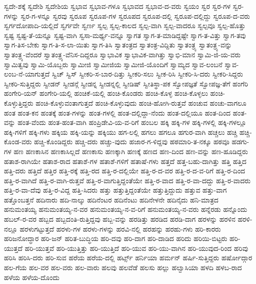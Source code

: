 {ಸ್ವದೇ-ಶಕ್ಕೆ
ಸ್ವದೇಶಿ
ಸ್ವದೇಶಿಯ
ಸ್ವಭಾವ
ಸ್ವಭಾವ-ಗಳೂ
ಸ್ವಭಾವದ
ಸ್ವಭಾವ-ದ-ವರು
ಸ್ವಯಂ
ಸ್ವರ
ಸ್ವರ-ಗಳ
ಸ್ವರ-ಗಳನ್ನು
ಸ್ವರ-ಗ-ಳನ್ನೂ
ಸ್ವರವು
ಸ್ವರೂಪ
ಸ್ವರೂಪ-ಗಳ
ಸ್ವರೂಪದ
ಸ್ವರೂಪ-ದಲ್ಲಿ
ಸ್ವರೂಪ-ದಲ್ಲಿದ್ದು
ಸ್ವರೂಪ-ದ-ವರು
ಸ್ವರ್ಗದೋಪಾದಿ-ಯಲ್ಲಿದೆ
ಸ್ವರ್ಗವೇ
ಸ್ವರ್ಣ
ಸ್ವಲ್ಪ
ಸ್ವಲ್ಪ-ಕಾಲದ
ಸ್ವಲ್ಪ-ವಾಗಿ
ಸ್ವಲ್ಪ-ವಾದರೂ
ಸ್ವಲ್ಪವೂ
ಸ್ವಲ್ಪ-ಹೊತ್ತು
ಸ್ವಷ್ಟ
ಸ್ವಷ್ಟ-ತೆ-ಯನ್ನೂ
ಸ್ವಷ್ಟ-ವಾಗಿ
ಸ್ವಸಾ-ಮರ್ಥ್ಯ-ವನ್ನೂ
ಸ್ವಾಗತ
ಸ್ವಾಗ-ತ-ಮಾಡಿದ್ದಷ್ಟೇ
ಸ್ವಾಗ-ತ-ವಿತ್ತು
ಸ್ವಾಗ-ತವು
ಸ್ವಾಗ-ತಿಸ-ಬೇಕು
ಸ್ವಾಗ-ತಿ-ಸ-ಲಾ-ಯಿತು
ಸ್ವಾಗ-ತಿಸಿ
ಸ್ವಾತಂತ್ರದ
ಸ್ವಾತಂತ್ರ-ವಿದ್ದಿತು
ಸ್ವಾತಂತ್ರ್ಯ
ಸ್ವಾತಂತ್ರ್ಯ-ವನ್ನು
ಸ್ವಾತಂತ್ರ್ಯ-ವೆಂದರೆ
ಸ್ವಾತಂತ್ರ್ಯ-ವೆನಿಸ-ದಿದ್ದರೂ
ಸ್ವಾಭಾವಿಕ
ಸ್ವಾಭಾವಿಕ-ವಾಗಿತ್ತು
ಸ್ವಾಭಿ-ಮಾನ
ಸ್ವಾಮಿ-ಜಿ-ಯ-ವರು
ಸ್ವಾಮಿತ್ವವು
ಸ್ವಾಮಿ-ಯೊಬ್ಬರು
ಸ್ವಾಮೀಜಿ
ಸ್ವಾಮೀಜಿಯ
ಸ್ವಾಮೀಜಿ-ಯೊಂದಿಗೆ
ಸ್ವಾಮ್ಯದ
ಸ್ವಾವ-ಲಂಬನೆ
ಸ್ವಾವ-ಲಂಬ-ನೆ-ಯಾಗುತ್ತದೆ
ಸ್ವಿಚ್
ಸ್ವಿಸ್
ಸ್ವೀಕರಿ-ಸ-ಬಾರ-ದಿತ್ತು
ಸ್ವೀಕರಿ-ಸಲು
ಸ್ವೀಕ-ರಿಸಿ
ಸ್ವೀಕರಿ-ಸಿ-ದರು
ಸ್ವೀಕರಿ-ಸಿದ್ದರು
ಸ್ವೀಕರಿ-ಸುತ್ತಿದ್ದರು
ಸ್ವೀಡನ್
ಸ್ವೀಡನ್ಗೆ
ಸ್ವೀಡನ್ನ
ಸ್ವೀಡನ್ನಲ್ಲಿ
ಸ್ವೀಡಿಷ್
ಸ್ವೀತಿಸ್ಥಾ-ಪಕ
ಸ್ವೋಪಜ್ಞತೆ
ಸ್ವೋಪಜ್ಞ-ತೆಗೆ
ಹಂಗೆರಿ
ಹಂಗೇರಿ-ಯನ್
ಹಂಗೇರಿ-ಯಲ್ಲಿ
ಹಂಚಿಕೆ-ಯಲ್ಲಿ
ಹಂಚಿ-ಕೊಂಡರು
ಹಂಚಿ-ಕೊಳ್ಳ
ಹಂಚಿ-ಕೊಳ್ಳಲು
ಹಂಚಿ-ಕೊಳ್ಳುತ್ತಿದ್ದರು
ಹಂಚಿ-ಕೊಳ್ಳುವಂತಾಗುತ್ತದೆ
ಹಂಚಿ-ಕೊಳ್ಳುವುದು
ಹಂಚಿ-ಹೋಗಿ-ರುತ್ತವೆ
ಹಂಚುವ
ಹಂಚು-ವಾಗಲೂ
ಹಂತ
ಹಂತ-ಕನ
ಹಂತಕ್ಕೆ
ಹಂತ-ಗಳನ್ನು
ಹಂತ-ಗಳಲ್ಲಿ
ಹಂತ-ದಲ್ಲಿದ್ದಾ-ನೆಂದು
ಹಂತ-ದಲ್ಲಿಯೂ
ಹಂತ-ದಿಂದ
ಹಂತ-ವನ್ನು
ಹಂತ-ವೆಂದು
ಹಂತ-ಹಂತ-ವಾಗಿ
ಹಂಪ್ರಿಡೇವಿ-ಯ-ವ-ರಿಗೆ
ಹಂಬಲ
ಹಕ್ಕಿ
ಹಕ್ಕಿ-ಗಳ
ಹಕ್ಕಿ-ಗಳಲ್ಲಿ
ಹಕ್ಕಿ-ಗಳಲ್ಲೂ
ಹಕ್ಕಿ-ಗಳಿಗೆ
ಹಕ್ಕಿ-ಗಳು
ಹಕ್ಕಿಯ
ಹಕ್ಕಿ-ಯನ್ನು
ಹಕ್ಕಿಯು
ಹಗ-ಲಲ್ಲಿ
ಹಗಲು
ಹಗಲೂ
ಹಗುರ-ವಾಗಿ
ಹಚ್ಚಲು
ಹಚ್ಚಿ
ಹಚ್ಚಿ-ಕೊಂಡ-ವರು
ಹಚ್ಚಿ-ಕೊಂಡಿದ್ದರು
ಹಚ್ಚಿ-ದರು
ಹಚ್ಚು-ವುದು
ಹಜಾರ-ಗ-ಳಿದ್ದವು
ಹಠಮಾರಿ-ತ-ನಕ್ಕೂ
ಹಠವೂ
ಹಡಗು-ಗಳ
ಹಣ
ಹಣಕಾಸಿನ
ಹಣಕಾಸಿಲ್ಲದೆ
ಹಣಕಾಸು
ಹಣಕ್ಕಾಗಿ
ಹಣಕ್ಕೆ
ಹಣದ
ಹಣ-ದಿಂದ
ಹಣ-ವನ್ನು
ಹಣ-ಹೂಡಿದ್ದರು
ಹತಾಶ-ರಾಗಿಯೇ
ಹತಾಶ-ರಾದ
ಹತಾಶೆ-ಗಳ
ಹತಾಶೆ-ಗಳಿಗೆ
ಹತಾಷೆ-ಗಳು
ಹತ್ತದೆ
ಹತ್ತ-ಬಹು-ದಾಗಿತ್ತು
ಹತ್ತಿ
ಹತ್ತಿದ
ಹತ್ತಿ-ದರು
ಹತ್ತಿದೆ
ಹತ್ತಿರ
ಹತ್ತಿ-ರಕ್ಕೆ
ಹತ್ತಿ-ರದ
ಹತ್ತಿ-ರ-ದಲ್ಲಿಯೇ
ಹತ್ತಿ-ರ-ದ-ವರ
ಹತ್ತಿ-ರ-ದ-ವ-ರಿಗೆ
ಹತ್ತಿ-ರ-ದಿಂದ
ಹತ್ತಿ-ರ-ವಾಗಿದೆ
ಹತ್ತಿ-ರ-ವಾಗಿ-ರುತ್ತವೆ
ಹತ್ತಿ-ರ-ವಾಗುತ್ತಿದ್ದಂತೆಯೇ
ಹತ್ತಿ-ರ-ವಾದ
ಹತ್ತಿ-ರ-ವಾ-ದದ್ದು
ಹತ್ತಿ-ರ-ವಾದರು
ಹತ್ತಿ-ರ-ವಾ-ದೆವು
ಹತ್ತಿ-ರ-ವಿದ್ದ
ಹತ್ತಿ-ಸಿದರು
ಹತ್ತು
ಹತ್ತುತ್ತಿದ್ದಂತೆಯೇ
ಹತ್ತುತ್ತಿದ್ದುದು
ಹತ್ತುವ
ಹತ್ತು-ವಾಗ
ಹತ್ತೊಂಬತ್ತನೆ
ಹದಿನಾರು
ಹದಿ-ನಾಲ್ಕು
ಹದಿನೆಂಟರ
ಹದಿನೆಂಟು
ಹದಿನೇಳನೇ
ಹದಿನೈದು
ಹನಿ-ಮಾತ್ರದ
ಹನುಮಂತಯ್ಯ
ಹನುಮಂತಯ್ಯ-ನ-ವರ
ಹನುಮಂತಯ್ಯ-ನ-ವ-ರಿಗೆ
ಹನುಮಂತಯ್ಯ-ನ-ವರು
ಹನ್ನೆರಡು
ಹನ್ನೊಂದು
ಹಬಲ್-ರ-ವರ
ಹಬ್ಬದ
ಹಬ್ಬದಂತಿ-ರುತ್ತಿದ್ದವು
ಹಬ್ಬ-ವನ್ನು
ಹರಡಿತ್ತು
ಹರಡಿದ
ಹರಡಿ-ದಾಗ
ಹರಳನ್ನು
ಹರಳಿನ
ಹರಳಿ-ನಲ್ಲೂ
ಹರಳುಗಟ್ಟುತ್ತದೆ
ಹರಳು-ಗಳ
ಹರಳು-ಗಳನ್ನು
ಹರವಿ-ನಲ್ಲಿ
ಹರಹನ್ನು
ಹರಹು-ಗಳು
ಹರಿ-ಕಾರರು
ಹರಿಜನೋದ್ಧಾರ
ಹರಿ-ಜನ್
ಹರಿತ-ಬುದ್ಧಿಯ
ಹರಿ-ದವು
ಹರಿ-ದಾಗ
ಹರಿ-ದಾಡಿದ
ಹರಿದು
ಹರಿಯಿ-ಬಿಟ್ಟರು
ಹರಿ-ಯುತ್ತದೆ
ಹರಿ-ಯುತ್ತವೆ
ಹರಿ-ಯುತ್ತಿತ್ತು
ಹರಿ-ಯುತ್ತಿದೆ
ಹರಿ-ಯುವ
ಹರಿ-ಯು-ವಾಗಿನ
ಹರಿ-ಯುವುದ-ರಿಂದ
ಹರಿವು
ಹರಿಸಿ
ಹರಿಸಿ-ದರು
ಹರಿ-ಸುವ
ಹರೆಯ
ಹರೆಯ-ದಲ್ಲಿ
ಹರ್ಟ್ಸ್
ಹರ್ನಿಯಾ
ಹರ್ಮನ್
ಹರ್ಷಿ-ಸುತ್ತಿದ್ದರು
ಹರ್ಷೋದ್ಗಾರ
ಹಲ-ಗೆಯ
ಹಲ-ವರ
ಹಲ-ವರು
ಹಲ-ವಾರು
ಹಲವು
ಹಲವೆಡೆ
ಹಲಸು
ಹಲ್ಲು
ಹಲ್ವಾಸಿಯಾ
ಹಳದಿ
ಹಳಬ-ರಾದ
ಹಳೆಯ
ಹಳೆಯ-ದೊಂದು
}
